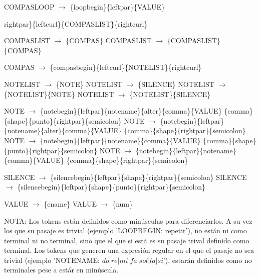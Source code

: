 COMPASLOOP $\rightarrow$ \{loopbegin\}\{leftpar\}\{VALUE\}\ {rightpar\}\{leftcurl\}\{COMPASLIST\}\{rightcurl\}\newline

COMPASLIST $\rightarrow$ \{COMPAS\}\newline
COMPASLIST $\rightarrow$ \{COMPASLIST\}\{COMPAS\}\newline

COMPAS $\rightarrow$ \{compasbegin\}\{leftcurl\}\{NOTELIST\}\{rightcurl\}\newline

NOTELIST $\rightarrow$ \{NOTE\}\newline
NOTELIST $\rightarrow$ \{SILENCE\}\newline
NOTELIST $\rightarrow$ \{NOTELIST\}\{NOTE\}\newline
NOTELIST $\rightarrow$ \{NOTELIST\}\{SILENCE\}\newline

NOTE $\rightarrow$ \{notebegin\}\{leftpar\}\{notename\}\{alter\}\{comma\}\{VALUE\} \{comma\}\{shape\}\{punto\}\{rightpar\}\{semicolon\}\newline
NOTE $\rightarrow$ \{notebegin\}\{leftpar\}\{notename\}\{alter\}\{comma\}\{VALUE\} \{comma\}\{shape\}\{rightpar\}\{semicolon\}\newline
NOTE $\rightarrow$ \{notebegin\}\{leftpar\}\{notename\}\{comma\}\{VALUE\} \{comma\}\{shape\}\{punto\}\{rightpar\}\{semicolon\}\newline
NOTE $\rightarrow$ \{notebegin\}\{leftpar\}\{notename\}\{comma\}\{VALUE\} \{comma\}\{shape\}\{rightpar\}\{semicolon\}\newline

SILENCE $\rightarrow$ \{silencebegin\}\{leftpar\}\{shape\}\{rightpar\}\{semicolon\}\newline
SILENCE $\rightarrow$ \{silencebegin\}\{leftpar\}\{shape\}\{punto\}\{rightpar\}\{semicolon\}\newline

VALUE $\rightarrow$ \{cname\}\newline
VALUE $\rightarrow$ \{num\}\newline

NOTA: Los tokens están definidos como minúsculas para diferenciarlos. A su vez los que su pasaje es trivial (ejemplo 'LOOPBEGIN: repetir'), no están ni como terminal ni no terminal, sino que el que si está es su pasaje trival definido como terminal. Los tokens que generen una expresión regular en el que el pasaje no sea trivial (ejemplo 'NOTENAME: $do|re|mi|fa|sol|la|si$'), estarán definidos como no terminales pese a estár en minúscula.



}
